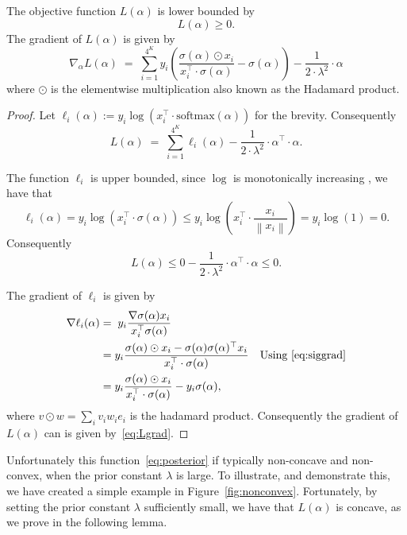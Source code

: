 \documentclass[11pt]{article}
\newcommand{\norm}[1]{ \left\| #1 \right\|}      %
\begin{document}
\begin{lemma}
The objective function $L(\alpha)$ is lower bounded by 
\begin{equation}
L(\alpha) \geq 0.
\end{equation}
The gradient of $L(\alpha)$ is given by
\begin{equation}\label{eq:Lgrad}
\nabla_{\alpha}  L(\alpha) \; =\;  \sum_{i=1}^{4^K} y_i \left(\frac{\sigma(\alpha) \odot  x_i}{ x_i^{\top} \cdot \sigma(\alpha) } - \sigma(\alpha)\right) - \frac{1}{2 \cdot \lambda^2} \cdot \alpha
\end{equation}
where $\odot$ is the  elementwise multiplication also known as the Hadamard product.
\end{lemma}
\begin{proof}
Let $\ell_i(\alpha) := y_i \log \left( x_i^{\top} \cdot \textrm{softmax}(\alpha) \right)$ for the brevity. Consequently
\begin{equation}
L(\alpha) \; =  \;\sum_{i=1}^{4^K} \ell_i(\alpha)  - \frac{1}{2 \cdot \lambda^2} \cdot \alpha^{\top} \cdot \alpha.
\end{equation}

The function $\ell_i$ is upper bounded, since $\log$ is monotonically increasing , we have that 
$$ \ell_i(\alpha) = y_i \log \left( x_i^{\top} \cdot \sigma(\alpha) \right) \leq y_i \log \left( x_i^{\top} \cdot \frac{x_i}{\norm{x_i}}\right) = y_i \log \left( 1\right) =0.$$
Consequently
\[ L(\alpha) \leq 0 - \frac{1}{2 \cdot \lambda^2} \cdot \alpha^{\top} \cdot \alpha \leq 0.\]


The gradient of $\ell_i$ is given by
\begin{align}
    \nabla \ell_i(\alpha) & = \; y_i\frac{\nabla \sigma(\alpha) x_i}{ x_i^{\top} \sigma(\alpha) } \nonumber \\
          & =  y_i\frac{\sigma(\alpha) \odot  x_i -\sigma(\alpha) \sigma(\alpha)^\top x_i}{ x_i^{\top} \cdot \sigma(\alpha) }
          & \mbox{Using~\eqref{eq:siggrad}} \nonumber  \\
          & = y_i \frac{\sigma(\alpha) \odot  x_i}{ x_i^{\top} \cdot \sigma(\alpha) } - y_i\sigma(\alpha), \label{eq:ligrad}
\end{align}
where $v\odot w = \sum_{i} v_i w_i e_i$ is the hadamard product. Consequently the gradient of $L(\alpha)$ can is given by~\eqref{eq:Lgrad}.

\end{proof}

Unfortunately this function~\eqref{eq:posterior} if typically non-concave and non-convex, when the prior constant $\lambda$ is large. To illustrate, and demonstrate this, we have created a simple example in Figure~\ref{fig:nonconvex}. Fortunately, by setting the prior constant $\lambda$ sufficiently small, we have that $L(\alpha)$ is concave, as we prove in the following lemma.
\end{document}
